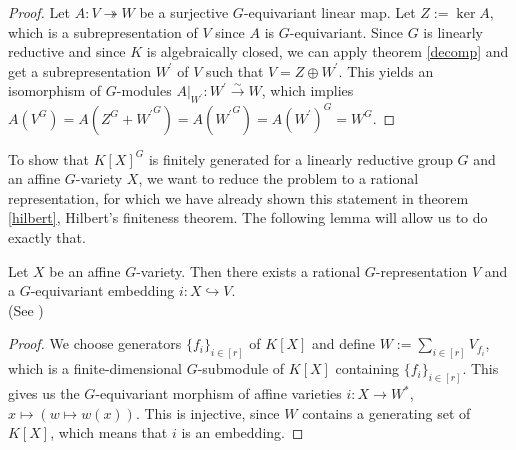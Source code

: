 \begin{proof}
  Let $A \colon V \twoheadrightarrow W$ be a surjective $G$-equivariant linear map.
  Let $Z := \operatorname{ker}A$, which is a subrepresentation of $V$ since $A$ is $G$-equivariant.
  Since $G$ is linearly reductive and since $K$ is algebraically closed, we can apply theorem \ref{decomp} and get a subrepresentation $W^\prime$ of $V$ such that $V = Z \oplus W^\prime$.
  This yields an isomorphism of $G$-modules $\left. A \right|_{W^\prime} \colon W^\prime \xrightarrow{\sim} W$, which implies $A(V^G) = A(Z^G + {W^\prime}^G) = A({W^\prime}^G) = A(W^\prime)^G = W^G$.
\end{proof}

To show that $K[X]^G$ is finitely generated for a linearly reductive group $G$ and an affine $G$-variety $X$, we want to reduce the problem to a rational representation, for which we have already shown this statement in theorem \ref{hilbert}, Hilbert's finiteness theorem.
The following lemma will allow us to do exactly that.

\begin{lemma}\label{emb}
  Let $X$ be an affine $G$-variety.
  Then there exists a rational \linebreak$G$-representation $V$ and a $G$-equivariant embedding $i \colon X \hookrightarrow V$.  \\
  (See \cite[A1.9]{DK15})
\end{lemma}



\begin{proof}
  We choose generators $\{f_i\}_{i \in [r]}$ of $K[X]$ and define $W := \sum_{i \in [r]} V_{f_i}$, which is a finite-dimensional $G$-submodule of $K[X]$ containing $\{f_i\}_{i \in [r]}$. %
  This gives us the $G$-equivariant morphism of affine varieties $i \colon X \rightarrow W^\ast$, \linebreak$x \mapsto (w \mapsto w(x))$.
  This is injective, since $W$ contains a generating set of $K[X]$, which means that $i$ is an embedding.
\end{proof}


